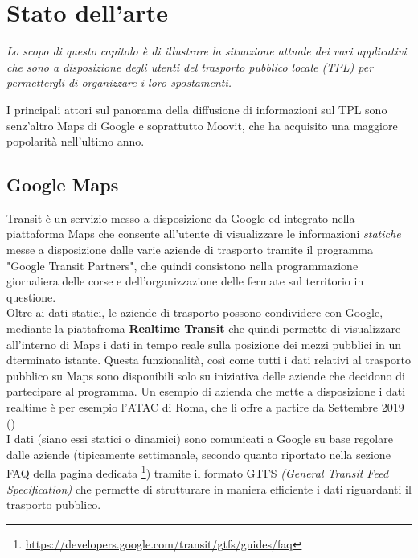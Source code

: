 \chapter{Stato dell'arte} %
%

\begin{citazione}
    \textit{Lo scopo di questo capitolo è di illustrare la situazione attuale dei vari applicativi che sono a disposizione degli utenti del trasporto pubblico locale (TPL) per permettergli di organizzare i loro spostamenti.}
\end{citazione}

\newpage

I principali attori sul panorama della diffusione di informazioni sul TPL sono senz'altro Maps di Google e soprattutto Moovit, che ha acquisito una maggiore popolarità nell'ultimo anno.

\section{Google Maps}
    Transit è un servizio messo a disposizione da Google ed integrato nella piattaforma Maps che consente all'utente di visualizzare le informazioni \textit{statiche} messe a disposizione dalle varie aziende di trasporto tramite il programma "Google Transit Partners", che quindi consistono nella programmazione giornaliera delle corse e dell'organizzazione delle fermate sul territorio in questione. \\
    Oltre ai dati statici, le aziende di trasporto possono condividere con Google, mediante la piattafroma \textbf{Realtime Transit} che quindi permette di visualizzare all'interno di Maps i dati in tempo reale sulla posizione dei mezzi pubblici in un dterminato istante. Questa funzionalità, così come tutti i dati relativi al trasporto pubblico su Maps sono disponibili solo su iniziativa delle aziende che decidono di partecipare al programma. Un esempio di azienda che mette a disposizione i dati realtime è per esempio l'ATAC di Roma, che li offre a partire da Settembre 2019 (\cite{atactransit})  \\
    I dati (siano essi statici o dinamici) sono comunicati a Google su base regolare dalle aziende (tipicamente settimanale, secondo quanto riportato nella sezione FAQ della pagina dedicata \footnote[3]{\url{https://developers.google.com/transit/gtfs/guides/faq}}) tramite il formato GTFS \textit{(General Transit Feed Specification)} che permette di strutturare in maniera efficiente i dati riguardanti il trasporto pubblico.


